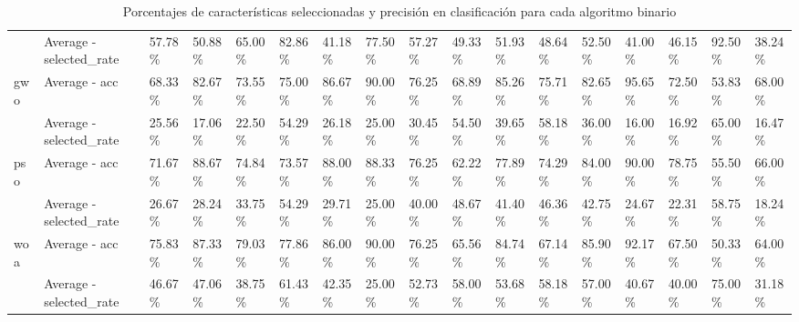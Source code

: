 \begin{table}
\begin{adjustbox}{width=\linewidth}
\begin{tabular}{lllllllllllllllll}
                      & Average - selected\_rate & 57.78\%       & 50.88\%     & 65.00\%  & 82.86\% & 41.18\%    & 77.50\% & 57.27\%    & 49.33\% & 51.93\%      & 48.64\%      & 52.50\%      & 41.00\% & 46.15\% & 92.50\% & 38.24\%\tabularnewline
            gwo       & Average - acc            & 68.33\%       & 82.67\%     & 73.55\%  & 75.00\% & 86.67\%    & 90.00\% & 76.25\%    & 68.89\% & 85.26\%      & 75.71\%      & 82.65\%      & 95.65\% & 72.50\% & 53.83\% & 68.00\%\tabularnewline
                      & Average - selected\_rate & 25.56\%       & 17.06\%     & 22.50\%  & 54.29\% & 26.18\%    & 25.00\% & 30.45\%    & 54.50\% & 39.65\%      & 58.18\%      & 36.00\%      & 16.00\% & 16.92\% & 65.00\% & 16.47\%\tabularnewline
            pso       & Average - acc            & 71.67\%       & 88.67\%     & 74.84\%  & 73.57\% & 88.00\%    & 88.33\% & 76.25\%    & 62.22\% & 77.89\%      & 74.29\%      & 84.00\%      & 90.00\% & 78.75\% & 55.50\% & 66.00\%\tabularnewline
                      & Average - selected\_rate & 26.67\%       & 28.24\%     & 33.75\%  & 54.29\% & 29.71\%    & 25.00\% & 40.00\%    & 48.67\% & 41.40\%      & 46.36\%      & 42.75\%      & 24.67\% & 22.31\% & 58.75\% & 18.24\%\tabularnewline
            woa       & Average - acc            & 75.83\%       & 87.33\%     & 79.03\%  & 77.86\% & 86.00\%    & 90.00\% & 76.25\%    & 65.56\% & 84.74\%      & 67.14\%      & 85.90\%      & 92.17\% & 67.50\% & 50.33\% & 64.00\%\tabularnewline
                      & Average - selected\_rate & 46.67\%       & 47.06\%     & 38.75\%  & 61.43\% & 42.35\%    & 25.00\% & 52.73\%    & 58.00\% & 53.68\%      & 58.18\%      & 57.00\%      & 40.67\% & 40.00\% & 75.00\% & 31.18\%\tabularnewline
            \bottomrule
        \end{tabular}
    \end{adjustbox}
    \caption{Porcentajes de características seleccionadas y precisión en clasificación para cada algoritmo binario}
    \label{tab:bin_red_acc_all}
\end{table}

